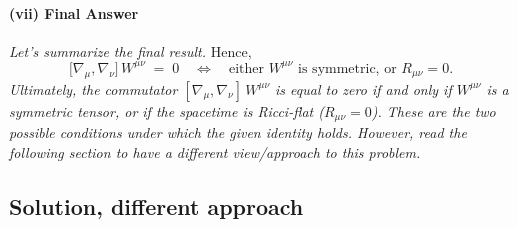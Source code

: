 \paragraph{(vii) Final Answer}
\textit{Let's summarize the final result.}
Hence,
\[
\bigl[\nabla_{\mu}, \nabla_{\nu}\bigr]\,W^{\mu\nu}
\;=\;0
\quad
\Longleftrightarrow
\quad
\text{either }W^{\mu\nu}\text{ is symmetric, or }R_{\mu\nu}=0.
\]
\textit{Ultimately, the commutator \([\nabla_{\mu}, \nabla_{\nu}]\,W^{\mu\nu}\) is equal to zero if and only if \(W^{\mu\nu}\) is a symmetric tensor, or if the spacetime is Ricci-flat (\(R_{\mu\nu}=0\)). These are the two possible conditions under which the given identity holds.
However, read the following section to have a different view/approach to this problem.}

\subsection*{Solution, different approach}

